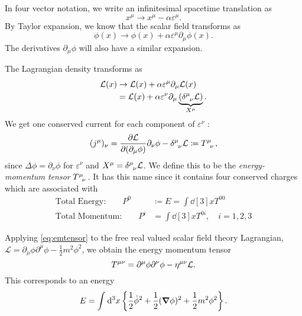 
\begin{example}
In four vector notation, we write an infinitesimal spacetime translation as 
\begin{equation}
  x^\mu \to x^\mu - \alpha \varepsilon^\mu.
\end{equation}
By Taylor expansion, we know that the scalar field transforms as
\begin{equation}
  \phi(x) \to \phi(x) + \alpha \varepsilon^\mu \partial_\mu \phi(x).
\end{equation}
The derivatives $\partial_\mu \phi$ will also have a similar expansion.

The Lagrangian density transforms as
\begin{align}
  \mathcal{L}(x) &\to \mathcal{L}(x) + \alpha \varepsilon^\mu \partial_\mu \mathcal{L}(x) \\
  &= \mathcal{L}(x) + \alpha \varepsilon^\nu \partial_\mu \underbrace{(\delta \indices{^\mu_\nu} \mathcal{L})}_{X^\mu}.
\end{align}
We get one conserved current for each component of $\varepsilon^\nu$ :
\begin{equation}
  \label{eq:emtensor}
  (j^\mu)_\nu = \pdv{\mathcal{L}}{(\partial_\mu \phi)} \partial_\nu \phi - \delta \indices{^\mu_\nu} \mathcal{L} \coloneqq T \indices{^{\mu}_{\nu}},
\end{equation}
since $\Delta \phi = \partial_\nu \phi$ for $ \varepsilon^\nu$ and $X^\mu = \delta \indices{^\mu_\nu} \mathcal{L}$.
  We define this to be the \emph{energy-momentum tensor} $T \indices{^\mu _\nu}$. It has this name since it contains four conserved charges which are associated with
  \begin{align}
    \text{Total Energy:} \qquad P^0 &\coloneqq E = \int \dd[3]{x} T^{00} \label{eq:total_energy} \\
    \text{Total Momentum:} \qquad P^{i} &= \int \dd[3]{x} T^{0i}, \quad i = 1,2,3 \label{eq:total_momentum}
  \end{align}

  Applying \eqref{eq:emtensor} to the free real valued scalar field theory Lagrangian, $\mathcal{L} =  \partial_\mu \phi \partial^\mu \phi - \frac{1}{2} m^2 \phi^2$,
  we obtain the energy momentum tensor
  \begin{equation}
    T \indices{^\mu^\nu} = \partial^\mu \phi \partial^\nu \phi - \eta\indices{^\mu^\nu} \mathcal{L}.
  \end{equation}
  This corresponds to an energy
  \begin{equation}
    E = \int_{}^{} \dd[3]{x}\left\{ \frac{1}{2} \dot \phi^2 + \frac{1}{2} (\grad \phi)^2 + \frac{1}{2} m^2 \phi^2 \right\}.
  \end{equation}
\end{example}

